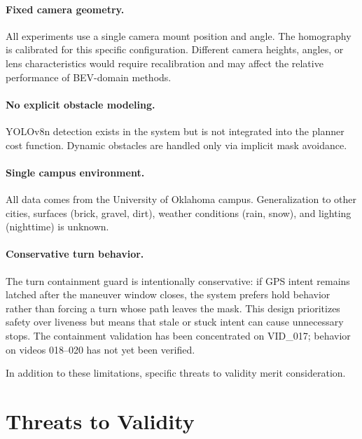 \documentclass[12pt,letterpaper,oneside]{report}
\begin{document}
\paragraph{Fixed camera geometry.} All experiments use a single camera mount position and angle.  The homography is calibrated for this specific configuration.  Different camera heights, angles, or lens characteristics would require recalibration and may affect the relative performance of BEV-domain methods.

\paragraph{No explicit obstacle modeling.} YOLOv8n detection exists in the system but is not integrated into the planner cost function.  Dynamic obstacles are handled only via implicit mask avoidance.

\paragraph{Single campus environment.} All data comes from the University of Oklahoma campus.  Generalization to other cities, surfaces (brick, gravel, dirt), weather conditions (rain, snow), and lighting (nighttime) is unknown.

\paragraph{Conservative turn behavior.} The turn containment guard is intentionally conservative: if GPS intent remains latched after the maneuver window closes, the system prefers hold behavior rather than forcing a turn whose path leaves the mask.  This design prioritizes safety over liveness but means that stale or stuck intent can cause unnecessary stops.  The containment validation has been concentrated on VID\_017; behavior on videos 018--020 has not yet been verified.

In addition to these limitations, specific threats to validity merit consideration.


\section{Threats to Validity}
\label{sec:threats}
\end{document}

